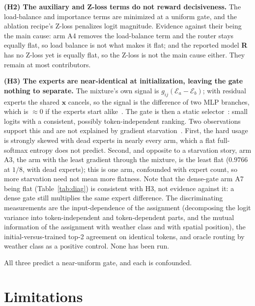 \documentclass[10pt,a4paper,twocolumn,twoside]{article}
\newcommand{\bx}{\mathbf{x}}
\newcommand{\E}{\mathcal{E}}
\begin{document}
\textbf{(H2) The auxiliary and Z-loss terms do not reward decisiveness.} The load-balance and
importance terms are minimized at a uniform gate, and the ablation recipe's Z-loss penalizes
logit magnitude. Evidence against their being the main cause: arm A4 removes the
load-balance term and the router stays equally flat, so load balance is not what makes it flat;
and the reported model \textbf{R} has no Z-loss yet is equally flat, so the Z-loss is not the
main cause either. They remain at most contributors.

\textbf{(H3) The experts are near-identical at initialization, leaving the gate nothing to
separate.} The mixture's own signal is $g_{ij}(\E_a - \E_b)$; with residual experts the shared
$\bx$ cancels, so the signal is the difference of two MLP branches, which is $\approx 0$ if the
experts start alike~\cite{komatsuzaki2023upcycling}. The gate is then a static selector~\cite{chen2022understandingmoe,dai2022stablemoe}: small logits with a consistent,
possibly token-independent ranking. Two observations support this and are not explained by
gradient starvation~\cite{chi2022repcollapse}. First, the hard usage is strongly skewed with dead experts in nearly every
arm, which a flat full-softmax entropy does not predict. Second, and opposite to a starvation
story, arm A3, the arm with the least gradient through the mixture, is the least
flat ($0.9766$ at $1/8$, with dead experts); this is one arm, confounded with expert count, so
more starvation need not mean more flatness.
Note that the dense-gate arm A7 being flat (Table~\ref{tab:diag}) is consistent with H3,
not evidence against it: a dense gate still multiplies the same expert difference. The discriminating measurements
are the input-dependence of the assignment (decomposing the logit variance into
token-independent and token-dependent parts, and the mutual information of the assignment with
weather class and with spatial position), the initial-versus-trained top-2 agreement on
identical tokens, and oracle routing by weather class as a positive control. None has been run.

All three predict a near-uniform gate, and each is confounded.

\section{Limitations}
\label{sec:limits}
\end{document}
